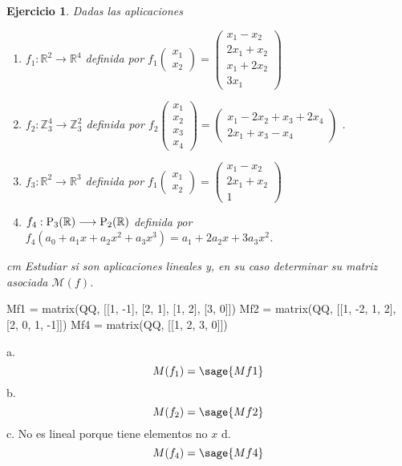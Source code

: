 \documentclass{amsart}
\newtheorem{ejer}{Ejercicio}
\def\r{\mathbb{R}}
\def\z{\mathbb{Z}}
\begin{document}
\begin{ejer} Dadas las aplicaciones
\begin{enumerate}
\item[a)] $f_1: \r ^2 \longrightarrow \r ^4$ definida por $f_1 \left( \begin{array}{c}
x_1 \\ x_2             
\end{array} \right) = \left( \begin{array}{c}
x_1-x_2 \\ 2x_1+x_2 \\ x_1+2x_2 \\ 3x_1      
\end{array} \right) $
\item[b)] $f_2: \z ^4_3 \longrightarrow \z ^2_3$ definida por $f_2 \left( \begin{array}{c}
x_1 \\ x_2 \\ x_3 \\ x_4            
\end{array} \right) = \left( \begin{array}{c}
x_1-2x_2+x_3+2x_4 \\ 2x_1+x_3-x_4             
\end{array} \right)$ .
\item[c)] $f_3: \r ^2 \longrightarrow \r ^3$ definida por $f_1 \left( \begin{array}{c}
x_1 \\ x_2             
\end{array} \right) = \left( \begin{array}{c}
x_1-x_2 \\ 2x_1+x_2 \\ 1      
\end{array} \right) $
\item[d)] $f_4:\hbox{P}_3(\r ) \longrightarrow  \hbox {P}_2(\r )$ definida por $f_4(a_0+a_1x+a_2x^2+a_3x^3) = a_1+2a_2x+3a_3x^2$.
\end{enumerate} 
 cm
Estudiar si son aplicaciones lineales y, en su caso determinar su matriz asociada $\mathcal{M}(f)$.
\end{ejer}

\begin{sageblock}
	Mf1 = matrix(QQ, [[1, -1], [2, 1], [1, 2], [3, 0]])
	Mf2 = matrix(QQ, [[1, -2, 1, 2], [2, 0, 1, -1]])
	Mf4 = matrix(QQ, [[1, 2, 3, 0]])
\end{sageblock}

a.
$$
	M(f_1) = \sage{Mf1}
$$
b.
$$
	M(f_2) = \sage{Mf2}
$$
c. No es lineal porque tiene elementos no $x$
d.
$$
	M(f_4) = \sage{Mf4}
$$
\end{document}
